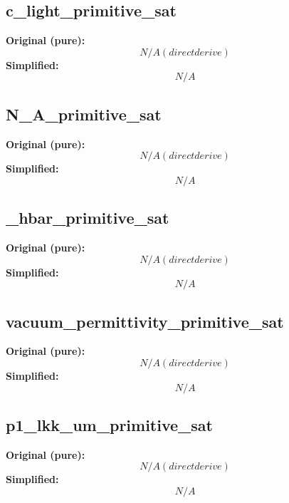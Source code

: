 \subsection{c_light_primitive_sat}
\textbf{Original (pure):}
\begin{equation}
N/A (direct derive)
\end{equation}
\textbf{Simplified:}
\begin{equation}
N/A
\end{equation}

\subsection{N_A_primitive_sat}
\textbf{Original (pure):}
\begin{equation}
N/A (direct derive)
\end{equation}
\textbf{Simplified:}
\begin{equation}
N/A
\end{equation}

\subsection{_hbar_primitive_sat}
\textbf{Original (pure):}
\begin{equation}
N/A (direct derive)
\end{equation}
\textbf{Simplified:}
\begin{equation}
N/A
\end{equation}

\subsection{vacuum_permittivity_primitive_sat}
\textbf{Original (pure):}
\begin{equation}
N/A (direct derive)
\end{equation}
\textbf{Simplified:}
\begin{equation}
N/A
\end{equation}

\subsection{p1_lkk_um_primitive_sat}
\textbf{Original (pure):}
\begin{equation}
N/A (direct derive)
\end{equation}
\textbf{Simplified:}
\begin{equation}
N/A
\end{equation}

